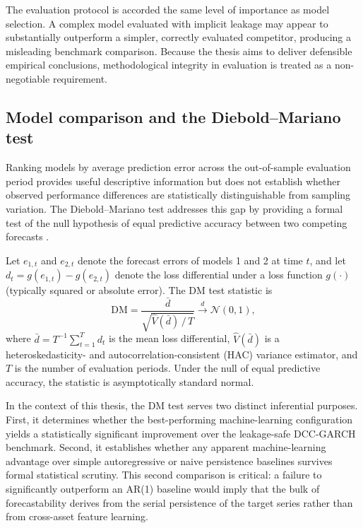 The evaluation protocol is accorded the same level of importance as model selection. A complex model evaluated with implicit leakage may appear to substantially outperform a simpler, correctly evaluated competitor, producing a misleading benchmark comparison. Because the thesis aims to deliver defensible empirical conclusions, methodological integrity in evaluation is treated as a non-negotiable requirement.

\subsection{Model comparison and the Diebold--Mariano test}

Ranking models by average prediction error across the out-of-sample evaluation period provides useful descriptive information but does not establish whether observed performance differences are statistically distinguishable from sampling variation. The Diebold--Mariano test addresses this gap by providing a formal test of the null hypothesis of equal predictive accuracy between two competing forecasts \cite{diebold1995}.

Let $e_{1,t}$ and $e_{2,t}$ denote the forecast errors of models 1 and 2 at time $t$, and let $d_t = g(e_{1,t}) - g(e_{2,t})$ denote the loss differential under a loss function $g(\cdot)$ (typically squared or absolute error). The DM test statistic is
\begin{equation}
    \mathrm{DM} = \frac{\bar{d}}{\sqrt{\hat{V}(\bar{d})\,/\, T}} \xrightarrow{d} \mathcal{N}(0,1),
\end{equation}
where $\bar{d} = T^{-1}\sum_{t=1}^{T} d_t$ is the mean loss differential, $\hat{V}(\bar{d})$ is a heteroskedasticity- and autocorrelation-consistent (HAC) variance estimator, and $T$ is the number of evaluation periods. Under the null of equal predictive accuracy, the statistic is asymptotically standard normal.

In the context of this thesis, the DM test serves two distinct inferential purposes. First, it determines whether the best-performing machine-learning configuration yields a statistically significant improvement over the leakage-safe DCC-GARCH benchmark. Second, it establishes whether any apparent machine-learning advantage over simple autoregressive or naive persistence baselines survives formal statistical scrutiny. This second comparison is critical: a failure to significantly outperform an AR(1) baseline would imply that the bulk of forecastability derives from the serial persistence of the target series rather than from cross-asset feature learning.

